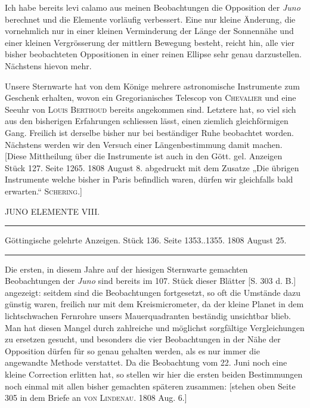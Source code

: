 \par\indent Ich habe bereits levi calamo aus meinen Beobachtungen die Opposition der \emph{Juno} berechnet und
die Elemente vorläufig verbessert. Eine nur kleine Änderung, die vornehmlich nur in einer kleinen
Verminderung der Länge der Sonnennähe und einer kleinen Vergrösserung der mittlern Bewegung besteht, reicht hin, alle vier bisher beobachteten Oppositionen in einer reinen Ellipse sehr genau darzustellen. Nächstens hievon mehr.

\par\indent Unsere Sternwarte hat von dem Könige mehrere astronomische Instrumente zum Geschenk erhalten, wovon ein Gregorianisches Telescop von \textsc{Chevalier} und eine Seeuhr von \textsc{Louis Berthoud} bereits angekommen sind. Letztere hat, so viel sich aus den bisherigen Erfahrungen schliessen lässt, einen ziemlich gleichförmigen Gang. Freilich ist derselbe bisher nur bei beständiger Ruhe beobachtet worden.
Nächstens werden wir den Versuch einer Längenbestimmung damit machen. [Diese Mittheilung über
die Instrumente ist auch in den Gött. gel. Anzeigen Stück 127. Seite 1265. 1808 August 8. abgedruckt
mit dem Zusatze „Die übrigen Instrumente welche bisher in Paris befindlich waren, dürfen wir gleichfalls bald erwarten.“ \textsc{Schering}.]

\begin{center}
JUNO ELEMENTE VIII.
\end{center}

\hrule
\begin{center}
\fontsize{10}{12}\selectfont Göttingische gelehrte Anzeigen. Stück 136. Seite 1353..1355. 1808 August 25.
\end{center}
\hrule

\par\indent Die ersten, in diesem Jahre auf der hiesigen Sternwarte gemachten Beobachtungen der \emph{Juno} sind
bereits im 107. Stück dieser Blätter [S. 303 d. B.] angezeigt: seitdem sind die Beobachtungen fortgesetzt,
so oft die Umstände dazu günstig waren, freilich nur mit dem Kreismicrometer, da der kleine Planet
in dem lichtschwachen Fernrohre unsers Mauerquadranten beständig unsichtbar blieb. Man hat diesen
Mangel durch zahlreiche und möglichst sorgfältige Vergleichungen zu ersetzen gesucht, und besonders
die vier Beobachtungen in der Nähe der Opposition dürfen für so genau gehalten werden, als es nur
immer die angewandte Methode verstattet. Da die Beobachtung vom 22. Juni noch eine kleine Correction erlitten hat, so stellen wir hier die ersten beiden Bestimmungen noch einmal mit allen bisher
gemachten späteren zusammen: [stehen oben Seite 305 in dem Briefe an \textsc{von Lindenau}. 1808 Aug. 6.]


